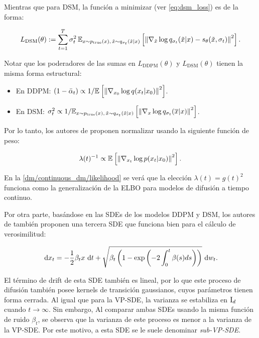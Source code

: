 Mientras que para DSM, la función a minimizar (ver \eqref{eq:dsm_loss}) es de la forma:

\begin{align*}
    L_{\text{DSM}}(\theta) := \sum_{t=1}^T \sigma_t^2 \,\mathbb{E}_{x\sim p_{\operatorname{true}}(x),\,\tilde{x}\sim q_{\sigma_t}(\tilde{x}|x)}\left[\left\lVert \nabla_{\tilde{x}}\log q_{\sigma_t}(\tilde{x}|x) - s_\theta(\tilde{x}, \sigma_t) \right\rVert^2\right].
\end{align*}

Notar que los poderadores de las sumas en $L_{\text{DDPM}}(\theta)$ y $L_{\text{DSM}}(\theta)$ tienen la misma forma estructural:

\begin{itemize}
    \item En DDPM: $(1-\bar\alpha_t)\propto 1/\mathbb{E}_{}\left[\left\lVert \nabla_{x_0} \log q(x_t|x_0) \right\rVert^2\right]$.
    \item En DSM: $\sigma_t^2\propto 1/\mathbb{E}_{x\sim p_{\operatorname{true}}(x),\,\tilde{x}\sim q_{\sigma_t}(\tilde{x}|x)}\left[\left\lVert \nabla_{x} \log q_{\sigma_t}(\overline{x}|x) \right\rVert^2\right]$.
\end{itemize}

Por lo tanto, los autores de \cite{song2021scorebased} proponen normalizar usando la siguiente función de peso:

\begin{equation*}
    \lambda(t)^{-1} \propto \mathbb{E}_{}\left[\left\lVert \nabla_{x_t} \log p(x_t|x_0) \right\rVert^2\right].
\end{equation*}

En la \autoref{dm/continuous_dm/likelihood} se verá que la elección $\lambda(t)=g(t)^2$ funciona como la generalización de la ELBO para modelos de difusión a tiempo continuo.

Por otra parte, basándose en las SDEs de los modelos DDPM y DSM, los autores de \cite{song2021scorebased} también proponen una tercera SDE que funciona bien para el cálculo de verosimilitud:

\begin{equation}
    \label{eq:lambda_loss}
    \,\operatorname{d}\! x_t = -\frac{1}{2}\beta_t x \,\operatorname{d}\! t + \sqrt{\beta_t\left(1-\exp\left(-2\int_0^t \beta(s)ds\right)\right)}\,\operatorname{d}\! w_t .
\end{equation}

El término de drift de esta SDE también es lineal, por lo que este proceso de difusión también posee kernels de transición gaussianos, cuyos parámetros tienen forma cerrada. Al igual que para la VP-SDE, la varianza se estabiliza en $\operatorname{I}_{d}$ cuando $t\to\infty$. Sin embargo, Al comparar ambas SDEs usando la misma función de ruido $\beta_t$, se observa que la varianza de este proceso es menor a la varianza de la VP-SDE. Por este motivo, a esta SDE se le suele denominar \textit{sub-VP-SDE}.

